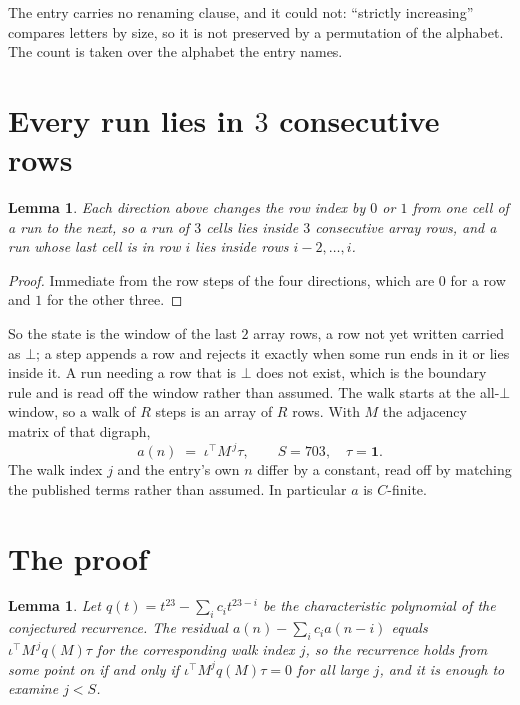 \documentclass[11pt,a4paper]{article}
\theoremstyle{plain}
\newtheorem{lemma}[theorem]{Lemma}
\theoremstyle{definition}
\begin{document}
The entry carries no renaming clause, and it could not: ``strictly increasing'' compares
letters by size, so it is not preserved by a permutation of the alphabet. The count is taken
over the alphabet the entry names.

\section{Every run lies in $3$ consecutive rows}

\begin{lemma}\label{lem:win}
Each direction above changes the row index by $0$ or $1$ from one cell of a run to the next, so
a run of $3$ cells lies inside $3$ consecutive array rows, and a run whose last cell is in
row $i$ lies inside rows $i-2,\dots,i$.
\end{lemma}

\begin{proof}
Immediate from the row steps of the four directions, which are $0$ for a row and $1$ for the
other three.
\end{proof}

So the state is the window of the last $2$ array rows, a row not yet written carried as
$\bot$; a step appends a row and rejects it exactly when some run ends in it or lies inside it.
A run needing a row that is $\bot$ does not exist, which is the boundary rule and is read off
the window rather than assumed. The walk starts at the all-$\bot$ window, so a walk of $R$ steps
is an array of $R$ rows. With $M$ the adjacency matrix of that digraph,
\[
a(n)\;=\;\iota^{\!\top}M^{\,j}\tau ,\qquad S=703,\quad\tau=\mathbf{1} .
\]
The walk index $j$ and the entry's own $n$ differ by a constant, read off by matching the
published terms rather than assumed. In particular $a$ is $C$-finite.

\section{The proof}

\begin{lemma}\label{lem:crit}
Let $q(t)=t^{23}-\sum_i c_it^{23-i}$ be the characteristic polynomial of the
conjectured recurrence. The residual $a(n)-\sum_ic_ia(n-i)$ equals
$\iota^{\!\top}M^{\,j}q(M)\tau$ for the corresponding walk index $j$, so the recurrence
holds from some point on if and only if $\iota^{\!\top}M^{j}q(M)\tau=0$ for all large $j$,
and it is enough to examine $j<S$.
\end{lemma}
\end{document}
